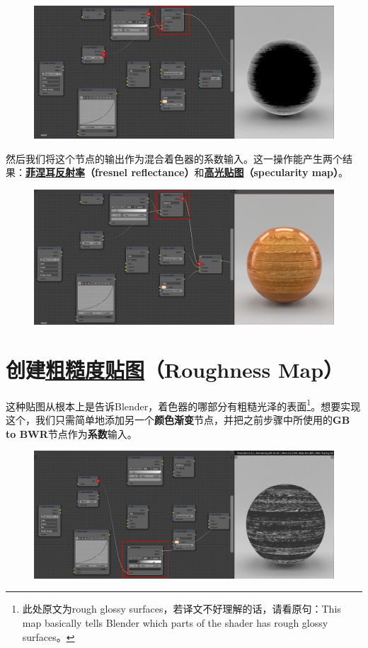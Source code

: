 \documentclass[11pt,a4paper,UTF8]{ctexart}
\begin{document}
\begin{figure}[hb]
    \centering
    \includegraphics[scale=0.41]{step4_1}
\end{figure}

\newpage
然后我们将这个节点的输出作为混合着色器的系数输入。这一操作能产生两个结果：\textbf{\underline{菲涅耳反射率}（fresnel reflectance）}和\textbf{\underline{高光贴图}（specularity map）}。

\begin{figure}[hb]
    \centering
    \includegraphics[scale=0.41]{step4_2}
\end{figure}

\section{创建\underline{粗糙度贴图}（Roughness Map）}
这种贴图从根本上是告诉Blender，着色器的哪部分有粗糙光泽的表面\footnote{此处原文为rough glossy surfaces，若译文不好理解的话，请看原句：This map basically tells Blender which parts of the shader has rough glossy surfaces。}。想要实现这个，我们只需简单地添加另一个\textbf{颜色渐变}节点，并把之前步骤中所使用的\textbf{GB to BWR}节点作为\textbf{系数}输入。

\begin{figure}[hb]
    \centering
    \includegraphics[scale=0.41]{step5_1.png}
\end{figure}
\end{document}
